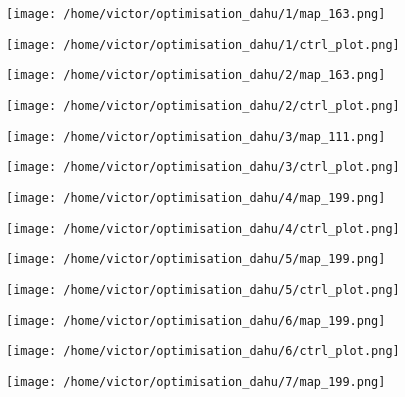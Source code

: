 \documentclass[../../Main_ManuscritThese.tex]{subfiles}
\begin{document}
\clearpage
\begin{figure}[ht]
  \centering
  \texttt{[image: /home/victor/optimisation\_dahu/1/map\_163.png]}
\end{figure}
\begin{figure}[ht]
  \centering
  \texttt{[image: /home/victor/optimisation\_dahu/1/ctrl\_plot.png]}
\end{figure}
\clearpage
\begin{figure}[ht]
  \centering
  \texttt{[image: /home/victor/optimisation\_dahu/2/map\_163.png]}
\end{figure}
\begin{figure}[ht]
  \centering
  \texttt{[image: /home/victor/optimisation\_dahu/2/ctrl\_plot.png]}
\end{figure}
\clearpage
\begin{figure}[ht]
  \centering
  \texttt{[image: /home/victor/optimisation\_dahu/3/map\_111.png]}
\end{figure}
\begin{figure}[ht]
  \centering
  \texttt{[image: /home/victor/optimisation\_dahu/3/ctrl\_plot.png]}
\end{figure}
\clearpage
\begin{figure}[ht]
  \centering
  \texttt{[image: /home/victor/optimisation\_dahu/4/map\_199.png]}
\end{figure}
\begin{figure}[ht]
  \centering
  \texttt{[image: /home/victor/optimisation\_dahu/4/ctrl\_plot.png]}
\end{figure}
\clearpage
\begin{figure}[ht]
  \centering
  \texttt{[image: /home/victor/optimisation\_dahu/5/map\_199.png]}
\end{figure}
\begin{figure}[ht]
  \centering
  \texttt{[image: /home/victor/optimisation\_dahu/5/ctrl\_plot.png]}
\end{figure}
\clearpage
\begin{figure}[ht]
  \centering
  \texttt{[image: /home/victor/optimisation\_dahu/6/map\_199.png]}
\end{figure}
\begin{figure}[ht]
  \centering
  \texttt{[image: /home/victor/optimisation\_dahu/6/ctrl\_plot.png]}
\end{figure}
\clearpage
\begin{figure}[ht]
  \centering
  \texttt{[image: /home/victor/optimisation\_dahu/7/map\_199.png]}
\end{figure}
\end{document}
